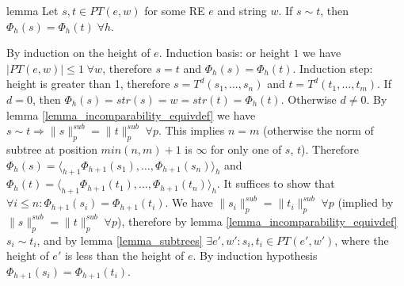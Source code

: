 \documentclass[AMA,STIX1COL]{WileyNJD-v2}
\newcommand{\Xl}{\langle}
\newcommand{\Xr}{\rangle}
\newcommand{\snorm}[2]{\|{#1}\|^{sub}_{#2}}
\begin{document}

\begin{theoremEnd}{lemma}
    \label{lemma_pe_equiv}
    Let $s, t \in PT(e, w)$ for some RE $e$ and string $w$.
    If $s \sim t$, then $\Phi_{h}(s) = \Phi_{h}(t) \; \forall h$.
\end{theoremEnd}
\begin{proofEnd}
    By induction on the height of $e$.
    Induction basis: or height $1$ we have
    $| PT(e, w) | \leq 1 \; \forall w$,
    therefore $s = t$ and $\Phi_{h}(s) = \Phi_{h}(t)$.
    Induction step:
    height is greater than 1, therefore
    $s = T^{d} (s_1, \dots, s_n)$ and
    $t = T^{d} (t_1, \dots, t_m)$.
    If $d = 0$, then $\Phi_{h}(s) = str(s) = w = str(t) = \Phi_{h}(t)$.
    Otherwise $d \neq 0$.
    By lemma \ref{lemma_incomparability_equivdef} we have $s \sim t \Rightarrow \snorm{s}{p} = \snorm{t}{p} \;\forall p$.
    This implies $n = m$ (otherwise the norm of subtree at position $min(n,m)+1$ is $\infty$ for only one of $s$, $t$).
    Therefore
    $\Phi_{h}(s) = \Xl_{h+1} \Phi_{h+1}(s_1), \dots, \Phi_{h+1}(s_n) \Xr_h$ and
    $\Phi_{h}(t) = \Xl_{h+1} \Phi_{h+1}(t_1), \dots, \Phi_{h+1}(t_n) \Xr_h$.
    It suffices to show that $\forall i \leq n: \Phi_{h+1}(s_i) = \Phi_{h+1}(t_i)$.
    We have $\snorm{s_i}{p} = \snorm{t_i}{p} \;\forall p$ (implied by $\snorm{s}{p} = \snorm{t}{p} \;\forall p$),
    therefore by lemma \ref{lemma_incomparability_equivdef} $s_i \sim t_i$,
    and by lemma \ref{lemma_subtrees} $\exists e', w': s_i, t_i \in PT(e', w')$,
    where the height of $e'$ is less than the height of $e$.
    By induction hypothesis $\Phi_{h+1}(s_i) = \Phi_{h+1}(t_i)$.
\end{proofEnd}
\end{document}
